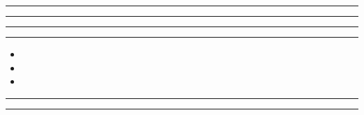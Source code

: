 \documentclass[11pt,a4paper]{article}
\begin{document}
\swarmwrapnext\lipsum[1]\lipsum[2]\lipsum[3]
\begin{swarmwrap}%
  \begin{minipage}[t]{5cm}
    \centering
    \textcolor{red!20}{\rule{\linewidth}{8cm}}
  \end{minipage}%
\end{swarmwrap}%
\swarmwrapnext\lipsum[1]\lipsum[2]\lipsum[3]\lipsum[4]
\begin{swarmwrap}%
  \begin{minipage}[t]{2cm}
    \centering
    \textcolor{red!20}{\rule{\linewidth}{9cm}}
  \end{minipage}%
\end{swarmwrap}%
\swarmwrapnext\lipsum[1]\lipsum[2]\lipsum[3]\lipsum[4]\lipsum[5]
\begin{swarmwrap}%
  \begin{minipage}[t]{3cm}
    \centering
    \textcolor{red!20}{\rule{\linewidth}{10cm}}
  \end{minipage}%
\end{swarmwrap}%
\swarmwrapnext\lipsum[1]\lipsum[2]\lipsum[3]\lipsum[4]\lipsum[5]\lipsum[6]
\begin{swarmwrap}%
  \begin{minipage}[t]{4cm}
    \centering
    \textcolor{green!30}{\rule{\linewidth}{2cm}}
  \end{minipage}%
\end{swarmwrap}%
\swarmwrapnext
\begin{itemize}
  \item \lipsum[1][1-3]
  \item \lipsum[2][1-3]
  \item \lipsum[3][1-3]
\end{itemize}
\begin{swarmwrap}%
  \begin{minipage}[t]{5cm}
    \centering
    \textcolor{red!20}{\rule{\linewidth}{3cm}}
  \end{minipage}%
\end{swarmwrap}%
\swarmwrapnext\lipsum[1]\lipsum[2]
\begin{swarmwrap}%
  \begin{minipage}[t]{2cm}
    \centering
    \textcolor{red!20}{\rule{\linewidth}{4cm}}
  \end{minipage}%
\end{swarmwrap}%
\end{document}
